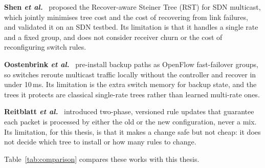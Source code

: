 \noindent \textbf{Shen \emph{et al.}}~\cite{shen2015rst} proposed the Recover-aware Steiner Tree (RST) for SDN multicast, which jointly minimises tree cost and the cost of recovering from link failures, and validated it on an SDN testbed. Its limitation is that it handles a single rate and a fixed group, and does not consider receiver churn or the cost of reconfiguring switch rules.

\noindent \textbf{Oostenbrink \emph{et al.}}~\cite{oostenbrink2017failover} pre-install backup paths as OpenFlow fast-failover groups, so switches reroute multicast traffic locally without the controller and recover in under 10\,ms. Its limitation is the extra switch memory for backup state, and the trees it protects are classical single-rate trees rather than learned multi-rate ones.

\noindent \textbf{Reitblatt \emph{et al.}}~\cite{reitblatt2012update} introduced two-phase, versioned rule updates that guarantee each packet is processed by either the old or the new configuration, never a mix. Its limitation, for this thesis, is that it makes a change safe but not cheap: it does not decide which tree to install or how many rules to change.

\noindent Table~\ref{tab:comparison} compares these works with this thesis.

